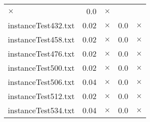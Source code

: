 \documentclass{article}
\begin{document}
\begin{center}
\begin{tabular}{lrrrr}
$\times$
 & 0.0 & 
$\times$
\\
instanceTest432.txt & 0.02 & 
$\times$
 & 0.0 & 
$\times$
\\
instanceTest458.txt & 0.02 & 
$\times$
 & 0.0 & 
$\times$
\\
instanceTest476.txt & 0.02 & 
$\times$
 & 0.0 & 
$\times$
\\
instanceTest500.txt & 0.02 & 
$\times$
 & 0.0 & 
$\times$
\\
instanceTest506.txt & 0.04 & 
$\times$
 & 0.0 & 
$\times$
\\
instanceTest512.txt & 0.02 & 
$\times$
 & 0.0 & 
$\times$
\\
instanceTest534.txt & 0.04 & 
$\times$
 & 0.0 & 
$\times$
\\
\hline\end{tabular}
\end{center}
\end{document}
